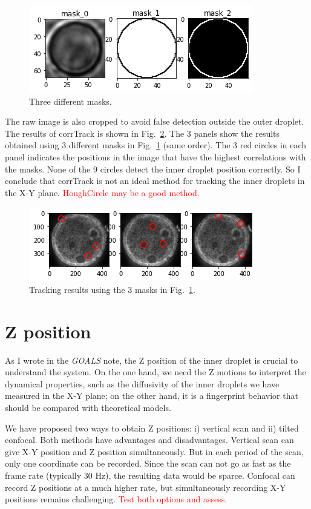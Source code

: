 \documentclass[onecolumn,aps, pre,amsmath,amssymb,longbibliography,12pt]{revtex4-2}
\begin{document}
\begin{figure}[h]
  \includegraphics{3-masks.png}
  \caption{Three different masks.}
  \label{fig:3-masks}
\end{figure}

The raw image is also cropped to avoid false detection outside the outer droplet.
The results of corrTrack is shown in Fig.~\ref{fig:3-mask-results}.
The 3 panels show the results obtained using 3 different masks in Fig.~\ref{fig:3-masks} (same order).
The 3 red circles in each panel indicates the positions in the image that have the highest correlations with the masks.
None of the 9 circles detect the inner droplet position correctly.
So I conclude that corrTrack is not an ideal method for tracking the inner droplets in the X-Y plane.
\textcolor{red}{HoughCircle may be a good method.}

\begin{figure}[h]
  \includegraphics{3-mask-results.png}
  \caption{Tracking results using the 3 masks in Fig.~\ref{fig:3-masks}.}
  \label{fig:3-mask-results}
\end{figure}


\section{Z position}
As I wrote in the \textit{GOALS} note, the Z position of the inner droplet is crucial to understand the system.
On the one hand, we need the Z motions to interpret the dynamical properties, such as the diffusivity of the inner droplets we have measured in the X-Y plane;
on the other hand, it is a fingerprint behavior that should be compared with theoretical models.

We have proposed two ways to obtain Z positions: i) vertical scan and ii) tilted confocal.
Both methods have advantages and disadvantages.
Vertical scan can give X-Y position and Z position simultaneously.
But in each period of the scan, only one coordinate can be recorded.
Since the scan can not go as fast as the frame rate (typically 30 Hz), the resulting data would be sparce.
Confocal can record Z positions at a much higher rate, but simultaneously recording X-Y positions remains challenging.
\textcolor{red}{Test both options and assess.}
\end{document}
